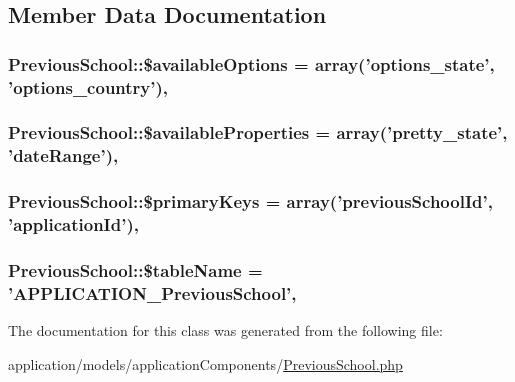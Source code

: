\subsection{Member Data Documentation}
\hypertarget{class_previous_school_a709b38f9ebb9b1d8a0a7d4a970e4952d}{
\subsubsection[{\$available\-Options}]{\setlength{\rightskip}{0pt plus 5cm}Previous\-School\-::\$available\-Options = array('options\-\_\-state', 'options\-\_\-country')\hspace{0.3cm}{\ttfamily [static]}, {\ttfamily [protected]}}}\label{class_previous_school_a709b38f9ebb9b1d8a0a7d4a970e4952d}
\hypertarget{class_previous_school_ac6fc68cec7b9b52c7fb37f76538b6d40}{
\subsubsection[{\$available\-Properties}]{\setlength{\rightskip}{0pt plus 5cm}Previous\-School\-::\$available\-Properties = array('pretty\-\_\-state', 'date\-Range')\hspace{0.3cm}{\ttfamily [static]}, {\ttfamily [protected]}}}\label{class_previous_school_ac6fc68cec7b9b52c7fb37f76538b6d40}
\hypertarget{class_previous_school_a07895b26cd4d09b5fa9487179a046d7e}{
\subsubsection[{\$primary\-Keys}]{\setlength{\rightskip}{0pt plus 5cm}Previous\-School\-::\$primary\-Keys = array('previous\-School\-Id', 'application\-Id')\hspace{0.3cm}{\ttfamily [static]}, {\ttfamily [protected]}}}\label{class_previous_school_a07895b26cd4d09b5fa9487179a046d7e}
\hypertarget{class_previous_school_a7a1b6c14d9780c99bd44f53abc4d8266}{
\subsubsection[{\$table\-Name}]{\setlength{\rightskip}{0pt plus 5cm}Previous\-School\-::\$table\-Name = 'A\-P\-P\-L\-I\-C\-A\-T\-I\-O\-N\-\_\-\-Previous\-School'\hspace{0.3cm}{\ttfamily [static]}, {\ttfamily [protected]}}}\label{class_previous_school_a7a1b6c14d9780c99bd44f53abc4d8266}


The documentation for this class was generated from the following file\-:\begin{DoxyCompactItemize}
\item 
application/models/application\-Components/\hyperlink{_previous_school_8php}{Previous\-School.\-php}\end{DoxyCompactItemize}
